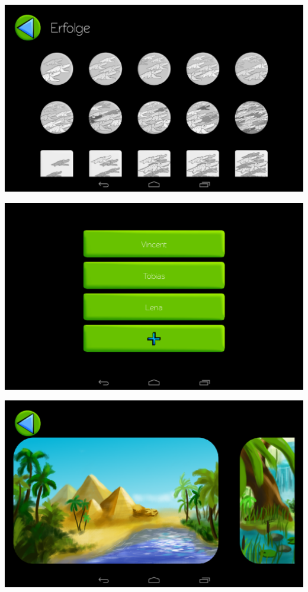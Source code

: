 \documentclass[t]{beamer}
\begin{document}
\begin{frame}
	\includegraphics[width=\textwidth]{images/screenshots/achievements}
\end{frame}

\begin{frame}
	\includegraphics[width=\textwidth]{images/screenshots/users}
\end{frame}

\begin{frame}
	\includegraphics[width=\textwidth]{images/screenshots/packages}
\end{frame}
\end{document}
